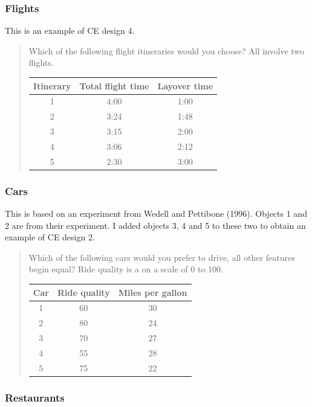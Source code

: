 \documentclass[11pt,letter]{amsart}
\begin{document}
\subsubsection{Flights}

This is an example of CE design 4.

\begin{quotation}
Which of the following flight itineraries would you choose? All involve two
flights.

\begin{tabular}{ccc}
\hline
Itinerary & Total flight time & Layover time \\ \hline
1 & 4:00 & 1:00 \\ 
2 & 3:24 & 1:48 \\ 
3 & 3:15 & 2:00 \\ 
4 & 3:06 & 2:12 \\ 
5 & 2:30 & 3:00 \\ \hline
\end{tabular}
\end{quotation}

\subsubsection{Cars}

This is based on an experiment from Wedell and Pettibone (1996). Objects 1
and 2 are from their experiment. I added objects 3, 4 and 5 to these two to
obtain an example of CE design 2.

\begin{quotation}
Which of the following cars would you prefer to drive, all other features
begin equal? Ride quality is a on a scale of 0 to 100.

\begin{tabular}{ccc}
\hline
Car & Ride quality & Miles per gallon \\ \hline
1 & 60 & 30 \\ 
2 & 80 & 24 \\ 
3 & 70 & 27 \\ 
4 & 55 & 28 \\ 
5 & 75 & 22 \\ \hline
\end{tabular}
\end{quotation}

\subsubsection{Restaurants}
\end{document}
